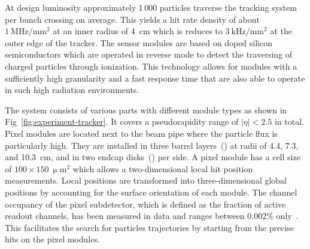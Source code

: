 At design luminosity approximately 1\,000 particles traverse the tracking system per bunch crossing on average. This yields a hit rate density of about $1~\mathrm{MHz/mm^2}$ at an inner radius of 4~cm which is reduces to $3~\mathrm{kHz/mm^2}$ at the outer edge of the tracker. The sensor modules are based on doped silicon semiconductors which are operated in reverse mode to detect the traversing of charged particles through ionization. This technology allows for modules with a sufficiently high granularity and a fast response time that are also able to operate in such high radiation environments.

The system consists of various parts with different module types as shown in Fig~\ref{fig:experiment-tracker}. It covers a pseudorapidity range of $|\eta|<2.5$ in total. Pixel modules are located next to the beam pipe where the particle flux is particularly high. They are installed in three barrel layers~() at radii of 4.4, 7.3, and 10.3~cm, and in two endcap disks~() per side. A pixel module has a cell size of $100\times150~\upmu\mathrm{m}^{2}$ which allows a two-dimensional local hit position measurements. Local positions are transformed into three-dimensional global positions by accounting for the surface orientation of each module. The channel occupancy of the pixel subdetector, which is defined as the fraction of active readout channels, has been measured in data and ranges between 0.002\% only~\cite{Chatrchyan:2014fea}. This facilitates the search for particles trajectories by starting from the precise hits on the pixel modules.


